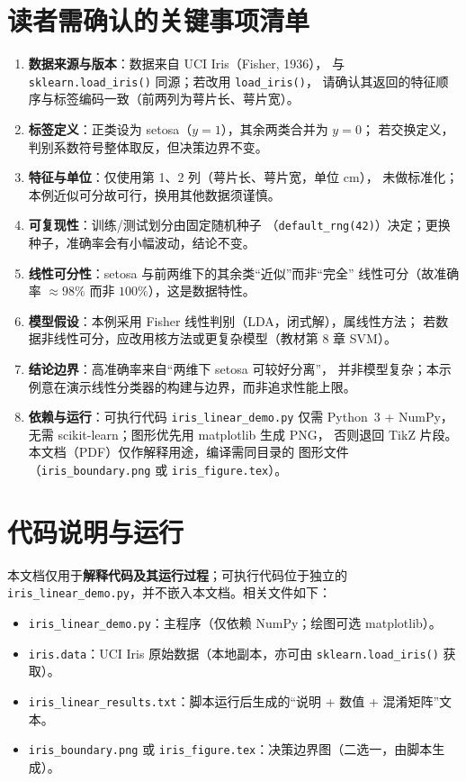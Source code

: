 \documentclass[UTF8, 11pt]{ctexart}
\begin{document}
\section{读者需确认的关键事项清单}
\label{sec:checklist}
\begin{enumerate}
  \item \textbf{数据来源与版本}：数据来自 UCI Iris（Fisher, 1936），
        与 \verb|sklearn.load_iris()| 同源；若改用 \verb|load_iris()|，
        请确认其返回的特征顺序与标签编码一致（前两列为萼片长、萼片宽）。
  \item \textbf{标签定义}：正类设为 setosa（$y=1$），其余两类合并为 $y=0$；
        若交换定义，判别系数符号整体取反，但决策边界不变。
  \item \textbf{特征与单位}：仅使用第 1、2 列（萼片长、萼片宽，单位 cm），
        未做标准化；本例近似可分故可行，换用其他数据须谨慎。
  \item \textbf{可复现性}：训练/测试划分由固定随机种子
        （\verb|default_rng(42)|）决定；更换种子，准确率会有小幅波动，结论不变。
  \item \textbf{线性可分性}：setosa 与前两维下的其余类“近似”而非“完全”
        线性可分（故准确率 $\approx 98\%$ 而非 $100\%$），这是数据特性。
  \item \textbf{模型假设}：本例采用 Fisher 线性判别（LDA，闭式解），属线性方法；
        若数据非线性可分，应改用核方法或更复杂模型（教材第 8 章 SVM）。
  \item \textbf{结论边界}：高准确率来自“两维下 setosa 可较好分离”，
        并非模型复杂；本示例意在演示线性分类器的构建与边界，而非追求性能上限。
  \item \textbf{依赖与运行}：可执行代码 \texttt{iris\_linear\_demo.py} 仅需
        Python~3 + NumPy，无需 scikit-learn；图形优先用 matplotlib 生成 PNG，
        否则退回 TikZ 片段。本文档（PDF）仅作解释用途，编译需同目录的
        图形文件（\texttt{iris\_boundary.png} 或 \texttt{iris\_figure.tex}）。
\end{enumerate}

\appendix
\section{代码说明与运行}
\label{sec:code}
本文档仅用于\textbf{解释代码及其运行过程}；可执行代码位于独立的
\texttt{iris\_linear\_demo.py}，并不嵌入本文档。相关文件如下：

\begin{itemize}
  \item \texttt{iris\_linear\_demo.py}：主程序（仅依赖 NumPy；绘图可选 matplotlib）。
  \item \texttt{iris.data}：UCI Iris 原始数据（本地副本，亦可由 \texttt{sklearn.load\_iris()} 获取）。
  \item \texttt{iris\_linear\_results.txt}：脚本运行后生成的“说明 + 数值 + 混淆矩阵”文本。
  \item \texttt{iris\_boundary.png} 或 \texttt{iris\_figure.tex}：决策边界图（二选一，由脚本生成）。
\end{itemize}
\end{document}
